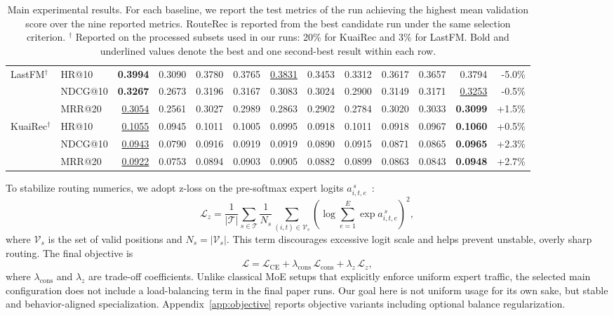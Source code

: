 \documentclass[sigconf,review,anonymous]{acmart}
\newcommand{\tblbest}[1]{\textbf{#1}}
\newcommand{\tblsecond}[1]{\underline{#1}}
\begin{document}
\begin{table}[t]
{\begin{tabular}{llrrrrrrrrrrr}
    \midrule
    \multirow{3}{*}{LastFM$^{\dagger}$}
      & HR@10   & \tblbest{0.3994} & 0.3090 & 0.3780 & 0.3765 & \tblsecond{0.3831} & 0.3453 & 0.3312 & 0.3617 & 0.3657 & 0.3794 & -5.0\% \\
      & NDCG@10 & \tblbest{0.3267} & 0.2673 & 0.3196 & 0.3167 & 0.3083 & 0.3024 & 0.2900 & 0.3149 & 0.3171 & \tblsecond{0.3253} & -0.5\% \\
      & MRR@20  & \tblsecond{0.3054} & 0.2561 & 0.3027 & 0.2989 & 0.2863 & 0.2902 & 0.2784 & 0.3020 & 0.3033 & \tblbest{0.3099} & +1.5\% \\
    \midrule
    \multirow{3}{*}{KuaiRec$^{\dagger}$}
      & HR@10   & \tblsecond{0.1055} & 0.0945 & 0.1011 & 0.1005 & 0.0995 & 0.0918 & 0.1011 & 0.0918 & 0.0967 & \tblbest{0.1060} & +0.5\% \\
      & NDCG@10 & \tblsecond{0.0943} & 0.0790 & 0.0916 & 0.0919 & 0.0919 & 0.0890 & 0.0915 & 0.0871 & 0.0865 & \tblbest{0.0965} & +2.3\% \\
      & MRR@20  & \tblsecond{0.0922} & 0.0753 & 0.0894 & 0.0903 & 0.0905 & 0.0882 & 0.0899 & 0.0863 & 0.0843 & \tblbest{0.0948} & +2.7\% \\
    \bottomrule
  \end{tabular}}
      \caption{Main experimental results. For each baseline, we report the test metrics of the run achieving the highest mean validation score over the nine reported metrics. RouteRec is reported from the best candidate run under the same selection criterion. $^{\dagger}$ Reported on the processed subsets used in our runs: 20\% for KuaiRec and 3\% for LastFM. Bold and underlined values denote the best and one second-best result within each row.}
  \label{tab:main-overall}
\end{table}
To stabilize routing numerics, we adopt z-loss on the pre-softmax expert logits $a_{i,t,e}^{\,s}$~\cite{zoph2022stmoe}:
\[
\mathcal{L}_{z}
=
\frac{1}{|\mathcal{T}|}
\sum_{s \in \mathcal{T}}
\frac{1}{N_s}
\sum_{(i,t)\in\mathcal{V}_s}
\left(
\log \sum_{e=1}^{E}\exp a_{i,t,e}^{\,s}
\right)^2,
\]
where $\mathcal{V}_s$ is the set of valid positions and $N_s=|\mathcal{V}_s|$. This term discourages excessive logit scale and helps prevent unstable, overly sharp routing. The final objective is
\[
\mathcal{L}
=
\mathcal{L}_{\mathrm{CE}}
+
\lambda_{\mathrm{cons}}\,\mathcal{L}_{\mathrm{cons}}
+
\lambda_{z}\,\mathcal{L}_{z},
\]
where $\lambda_{\mathrm{cons}}$ and $\lambda_z$ are trade-off coefficients. Unlike classical MoE setups that explicitly enforce uniform expert traffic, the selected main configuration does not include a load-balancing term in the final paper runs. Our goal here is not uniform usage for its own sake, but stable and behavior-aligned specialization. Appendix~\ref{app:objective} reports objective variants including optional balance regularization.
\end{document}
